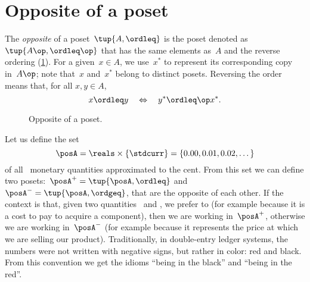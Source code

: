 

\section{Opposite of a poset}\label{sec:opposite-of-a-poset}

\begin{definition}
  \label{def:poset-opposite}
  The \emph{opposite} of a poset~$\tup{A, \ordleq} $ is the poset denoted as~$\tup{A\op, \ordleq\op}$ that has the same elements as~$A$ and the reverse ordering (\cref{fig:opposite}).
  For a given~$x \in A$, we use~$x^*$ to represent its corresponding copy in~$A\op$; note that~$x$ and~$x^*$ belong to distinct posets.
  Reversing the order means that, for all $x,y\in A$,
  \begin{equation}
    x \ordleq y \quad \Leftrightarrow \quad y^* \ordleq\op x^*.
  \end{equation}
\end{definition}

\begin{figure}[tbh]
  \centering
  \caption{Opposite of a poset.\label{fig:opposite}}
\end{figure}


\begin{example}
  Let us define the set
  \begin{equation*}
   \posA=\reals \times \{\stdcurr\}=\{0.00,0.01,0.02,\dots\}
  \end{equation*}
  of all \stdcurr \ monetary quantities approximated to the cent.
  From this set we can define two posets:~$\posA^{+} = \tup{\posA, \ordleq}$ and~$\posA^{-} = \tup{\posA, \ordgeq}$, that are the opposite of each other.
  If the context is that, given two quantities~\unit[1]{\stdcurr} and \unit[2]{\stdcurr}, we prefer \unit[1]{\stdcurr} to \unit[2]{\stdcurr} (for example because it is a cost to pay to acquire a component), then we are working in~$\posA^{+}$, otherwise we are working in~$\posA^{-}$ (for example because it represents the price at which we are selling our product).
  Traditionally, in double-entry ledger systems, the numbers were not written with negative signs, but rather in color: red and black. From this convention we get the idioms ``being in the black'' and ``being in the red''.
\end{example}
